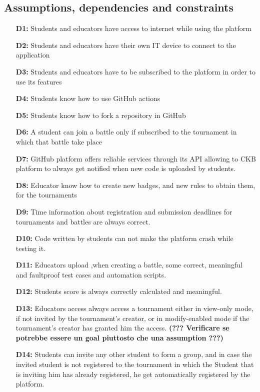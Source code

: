 \documentclass{article}
\begin{document}
{    \subsection{Assumptions, dependencies and constraints}
        \begin{itemize}
            \item[\textbf{D1:}] Students and educators have access to internet while using the platform
            \item[\textbf{D2:}] Students and educators have their own IT device to connect to the application
            \item[\textbf{D3:}] Students and educators have to be subscribed to the platform in order to use its features
            \item[\textbf{D4:}] Students know how to use GitHub actions
            \item[\textbf{D5:}] Students know how to fork a repository in GitHub
            \item[\textbf{D6:}] A student can join a battle only if subscribed to the tournament in which that battle take place
            \item[\textbf{D7:}] GitHub platform offers reliable services through its API allowing to CKB platform to always get notified when new code is uploaded by students.
            \item[\textbf{D8:}] Educator know how to create new badges, and new rules to obtain them, for the tournaments
            \item[\textbf{D9:}] Time information about registration and submission deadlines for tournaments and battles are always correct.
            \item[\textbf{D10:}] Code written by students can not make the platform crash while testing it.
            \item[\textbf{D11:}] Educators upload ,when creating a battle, some correct, meaningful and faultproof test cases and automation scripts.
            \item[\textbf{D12:}] Students score is always correctly calculated and meaningful.
            \item[\textbf{D13:}] Educators access always access a tournament either in view-only mode, if not invited by the tournament's creator, or in modify-enabled mode if the tournament's creator has granted him the access.
            \textbf{(??? Verificare se potrebbe essere un goal piuttosto che una assumption ???)}
            \item[\textbf{D14:}] Students can invite any other student to form a group, and in case
            the invited student is not registered to the tournament in which the Student that is 
            inviting him has already registered, he get automatically registered by the platform.
        \end{itemize}

}
\end{document}
